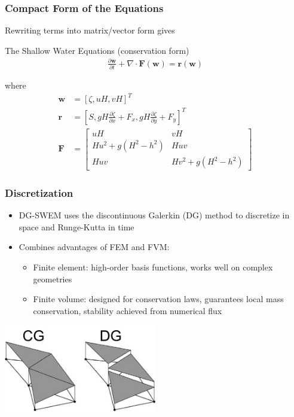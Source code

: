 \documentclass[10pt]{oden_beamer}
\newcommand\dt[1]{\frac{\partial #1}{\partial t}}
\newcommand\dx[1]{\frac{\partial #1}{\partial x}}
\newcommand\dy[1]{\frac{\partial #1}{\partial y}}
\begin{document}
\begin{frame}
  \frametitle{Compact Form of the Equations}
  Rewriting terms into matrix/vector form  gives
  \begin{block}{The Shallow Water Equations (conservation form)}
    \begin{align*}
    \dt{\mathbf{w}} + \nabla \cdot \mathbf{F}(\mathbf{w}) = \mathbf{r}(\mathbf{w})
    \end{align*}
  \end{block}
  where
  \begin{align*}
    \mathbf{w} &= [\zeta, uH, vH]^T \\
    \mathbf{r} &= [S, gH\dx{\zeta} + F_x, gH\dy{\zeta} + F_y]^T \\
    \mathbf{F} &=
                 \begin{bmatrix}
                   uH & vH \\
                   Hu^2 + g(H^2-h^2) & Huv \\
                   Huv & Hv^2 + g(H^2-h^2)
                 \end{bmatrix}
  \end{align*}
\end{frame}

\begin{frame}
  \frametitle{Discretization}
  \begin{itemize}
  \item DG-SWEM uses the discontinuous Galerkin (DG) method to discretize in space and Runge-Kutta in time
  \item Combines advantages of FEM and FVM:
    \begin{itemize}
    \item Finite element: high-order basis functions, works well on complex geometries
    \item Finite volume: designed for conservation laws, guarantees local mass conservation, stability achieved from numerical flux
    \end{itemize}
  \end{itemize}
  \centering
  \includegraphics[width=0.5\textwidth]{cgdg.jpg}
\end{frame}
\end{document}
